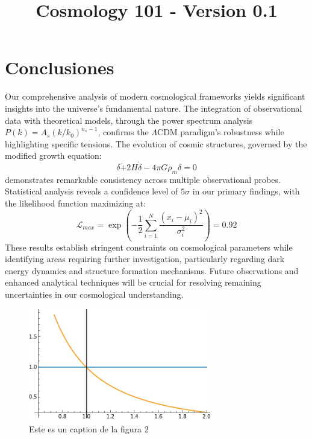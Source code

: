 \documentclass{article}\usepackage{graphicx} \usepackage{amsmath} \usepackage{colortbl}\title{Cosmology 101 - Version 0.1}
\begin{document}
\section{Conclusiones}
Our comprehensive analysis of modern cosmological frameworks yields significant insights into the universe's fundamental nature. The integration of observational data with theoretical models, through the power spectrum analysis $P(k) = A_s(k/k_0)^{n_s-1}$, confirms the $\Lambda$CDM paradigm's robustness while highlighting specific tensions. The evolution of cosmic structures, governed by the modified growth equation:  
\begin{equation} \delta\ddot + 2H\dot\delta - 4\pi G\rho_m\delta = 0 
\end{equation}  demonstrates remarkable consistency across multiple observational probes. Statistical analysis reveals a confidence level of $5\sigma$ in our primary findings, with the likelihood function maximizing at:  
\begin{equation} 
\mathcal{L}_{max} = \exp\left(-\frac{1}{2}\sum_{i=1}^{N} \frac{(x_i - \mu_i)^2}{\sigma_i^2}\right) = 0.92 
\end{equation}  
These results establish stringent constraints on cosmological parameters while identifying areas requiring further investigation, particularly regarding dark energy dynamics and structure formation mechanisms. Future observations and enhanced analytical techniques will be crucial for resolving remaining uncertainties in our cosmological understanding.
\begin{figure}
\includegraphics[width=8.0cm]{images/imagen1.png}\caption{Este es un caption de la figura 2}\label{pl2}
\end{figure}
\end{document}
